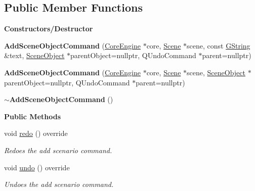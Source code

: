 \subsection*{Public Member Functions}
\begin{Indent}\textbf{ Constructors/\+Destructor}\par
\begin{DoxyCompactItemize}
\item 
\mbox{\label{classrev_1_1_add_scene_object_command_ad4500088c547049f2dfeccd0eb4b0c9e}} 
{\bfseries Add\+Scene\+Object\+Command} (\mbox{\hyperlink{classrev_1_1_core_engine}{Core\+Engine}} $\ast$core, \mbox{\hyperlink{classrev_1_1_scene}{Scene}} $\ast$scene, const \mbox{\hyperlink{classrev_1_1_g_string}{G\+String}} \&text, \mbox{\hyperlink{classrev_1_1_scene_object}{Scene\+Object}} $\ast$parent\+Object=nullptr, Q\+Undo\+Command $\ast$parent=nullptr)
\item 
\mbox{\label{classrev_1_1_add_scene_object_command_abdaab6f02245ecc4bae804e631aa207e}} 
{\bfseries Add\+Scene\+Object\+Command} (\mbox{\hyperlink{classrev_1_1_core_engine}{Core\+Engine}} $\ast$core, \mbox{\hyperlink{classrev_1_1_scene}{Scene}} $\ast$scene, \mbox{\hyperlink{classrev_1_1_scene_object}{Scene\+Object}} $\ast$parent\+Object=nullptr, Q\+Undo\+Command $\ast$parent=nullptr)
\item 
\mbox{\label{classrev_1_1_add_scene_object_command_a8f1bdaf961672609436a3f4572ca2c18}} 
{\bfseries $\sim$\+Add\+Scene\+Object\+Command} ()
\end{DoxyCompactItemize}
\end{Indent}
\begin{Indent}\textbf{ Public Methods}\par
\begin{DoxyCompactItemize}
\item 
\mbox{\label{classrev_1_1_add_scene_object_command_aefc9513fbbedd53cb8b7075f0e6468d0}} 
void \mbox{\hyperlink{classrev_1_1_add_scene_object_command_aefc9513fbbedd53cb8b7075f0e6468d0}{redo}} () override
\begin{DoxyCompactList}\small\item\em Redoes the add scenario command. \end{DoxyCompactList}\item 
\mbox{\label{classrev_1_1_add_scene_object_command_a98003785f554397ac10f76f7f12e7301}} 
void \mbox{\hyperlink{classrev_1_1_add_scene_object_command_a98003785f554397ac10f76f7f12e7301}{undo}} () override
\begin{DoxyCompactList}\small\item\em Undoes the add scenario command. \end{DoxyCompactList}\end{DoxyCompactItemize}
\end{Indent}
